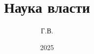 \documentclass[12pt,a4paper]{book}
\begin{document}
\frontmatter
\title{Наука власти}
\author{Г.В.}
\date{2025}
\maketitle
\tableofcontents

\mainmatter


\backmatter
\printbibliography
\end{document}
